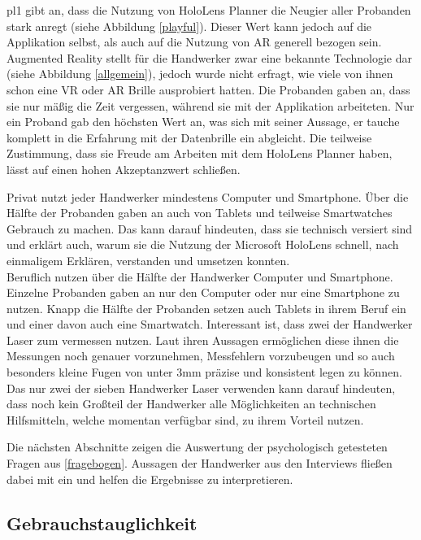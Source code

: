 pl1 gibt an, dass die Nutzung von HoloLens Planner die Neugier aller Probanden stark anregt (siehe Abbildung \ref{playful}). Dieser Wert kann jedoch auf die Applikation selbst, als auch auf die Nutzung von AR generell bezogen sein. Augmented Reality stellt für die Handwerker zwar eine bekannte Technologie dar (siehe Abbildung \ref{allgemein}), jedoch wurde nicht erfragt, wie viele von ihnen schon eine VR oder AR Brille ausprobiert hatten. Die Probanden gaben an, dass sie nur mäßig die Zeit vergessen, während sie mit der Applikation arbeiteten. Nur ein Proband gab den höchsten Wert an, was sich mit seiner Aussage, er tauche komplett in die Erfahrung mit der Datenbrille ein abgleicht. Die teilweise Zustimmung, dass sie Freude am Arbeiten mit dem HoloLens Planner haben, lässt auf einen hohen Akzeptanzwert schließen.

Privat nutzt jeder Handwerker mindestens Computer und Smartphone. Über die Hälfte der Probanden gaben an auch von Tablets und teilweise Smartwatches Gebrauch zu machen. Das kann darauf hindeuten, dass sie technisch versiert sind und erklärt auch, warum sie die Nutzung der Microsoft HoloLens schnell, nach einmaligem Erklären, verstanden und umsetzen konnten. \\
Beruflich nutzen über die Hälfte der Handwerker Computer und Smartphone. Einzelne Probanden gaben an nur den Computer oder nur eine Smartphone zu nutzen. Knapp die Hälfte der Probanden setzen auch Tablets in ihrem Beruf ein und einer davon auch eine Smartwatch. Interessant ist, dass zwei der Handwerker Laser zum vermessen nutzen. Laut ihren Aussagen ermöglichen diese ihnen die Messungen noch genauer vorzunehmen, Messfehlern vorzubeugen und so auch besonders kleine Fugen von unter 3mm präzise und konsistent legen zu können. Das nur zwei der sieben Handwerker Laser verwenden kann darauf hindeuten, dass noch kein Großteil der Handwerker alle Möglichkeiten an technischen Hilfsmitteln, welche momentan verfügbar sind, zu ihrem Vorteil nutzen.

Die nächsten Abschnitte zeigen die Auswertung der psychologisch getesteten Fragen aus \ref{fragebogen}. Aussagen der Handwerker aus den Interviews fließen dabei mit ein und helfen die Ergebnisse zu interpretieren.

\subsection{Gebrauchstauglichkeit}

